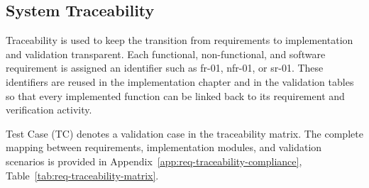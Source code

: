 \subsection{System Traceability}
\label{sec:system-traceability}

Traceability is used to keep the transition from requirements to implementation and validation transparent. Each functional, non-functional, and software requirement is assigned an identifier such as \acs{fr}-01, \acs{nfr}-01, or \acs{sr}-01. These identifiers are reused in the implementation chapter and in the validation tables so that every implemented function can be linked back to its requirement and verification activity.

Test Case (TC) denotes a validation case in the traceability matrix. The complete mapping between requirements, implementation modules, and validation scenarios is provided in Appendix~\ref{app:req-traceability-compliance}, Table~\ref{tab:req-traceability-matrix}.
